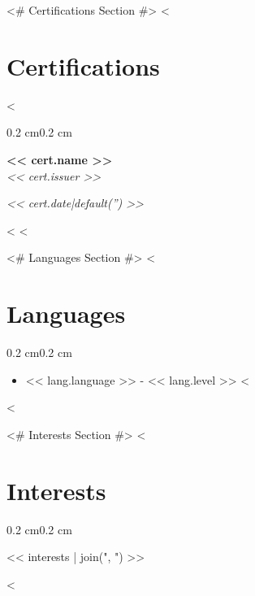 \documentclass[10pt, letterpaper]{article}
\newenvironment{highlights}{%
    \begin{itemize}[
        topsep=0.10 cm,%
        parsep=0.10 cm,%
        partopsep=0pt,%
        itemsep=0pt,%
        leftmargin=0.4 cm + 10pt%
    ]
}{%
    \end{itemize}%
}
\newenvironment{onecolentry}{%
    \begin{adjustwidth}{0.2 cm}{0.2 cm}%
}{%
    \end{adjustwidth}%
}
\newenvironment{twocolentry}[1]{%
    \begin{onecolentry}%
    \def\twocolentryarg{#1}%
    \noindent
    \begin{minipage}[t]{0.68\textwidth} %
}{%
    \end{minipage}\hfill%
    \begin{minipage}[t]{0.30\textwidth} %
      \raggedleft\twocolentryarg
    \end{minipage}%
    \vspace{0.2cm}%
    \end{onecolentry}%
}
\begin{document}
<# Certifications Section #>
<%
\section{Certifications}
<%
\begin{twocolentry}{\textit{<< cert.date|default('') >>}}
    \textbf{<< cert.name >> }\\
    \textit{<< cert.issuer >> }
\end{twocolentry}
\vspace{0.10 cm}
<%
<%

<# Languages Section #>
<%
\section{Languages}
\begin{onecolentry}
    \begin{highlights}
    <%
        \item << lang.language >> - << lang.level >>
    <%
    \end{highlights}
\end{onecolentry}
<%

<# Interests Section #>
<%
\section{Interests}
\begin{onecolentry}
    << interests | join(", ") >>
\end{onecolentry}
<%
\end{document}
